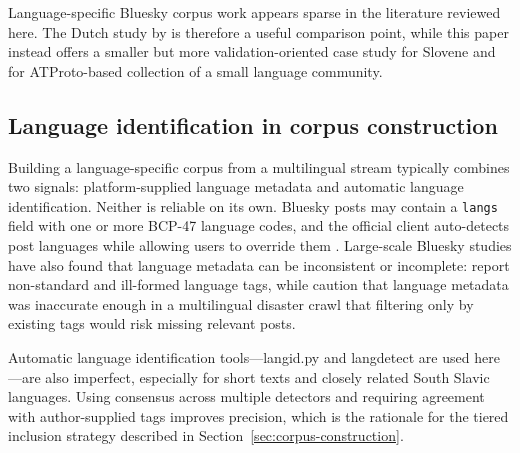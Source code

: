 Language-specific Bluesky corpus work appears sparse in the literature reviewed here. The Dutch study by \textcite{tjongKimSang2025bluesky} is therefore a useful comparison point, while this paper instead offers a smaller but more validation-oriented case study for Slovene and for ATProto-based collection of a small language community.

\subsection{Language identification in corpus construction}

Building a language-specific corpus from a multilingual stream typically combines two signals: platform-supplied language metadata and automatic language identification. Neither is reliable on its own. Bluesky posts may contain a \texttt{langs} field with one or more BCP-47 language codes, and the official client auto-detects post languages while allowing users to override them \parencite{bsky-posts}. Large-scale Bluesky studies have also found that language metadata can be inconsistent or incomplete: \textcite{failla2024bluesky} report non-standard and ill-formed language tags, while \textcite{hanny2026disaster} caution that language metadata was inaccurate enough in a multilingual disaster crawl that filtering only by existing tags would risk missing relevant posts.

Automatic language identification tools---langid.py \parencite{lui2012langid} and langdetect \parencite{nakatani2010langdetect} are used here---are also imperfect, especially for short texts and closely related South Slavic languages. Using consensus across multiple detectors and requiring agreement with author-supplied tags improves precision, which is the rationale for the tiered inclusion strategy described in Section~\ref{sec:corpus-construction}.
